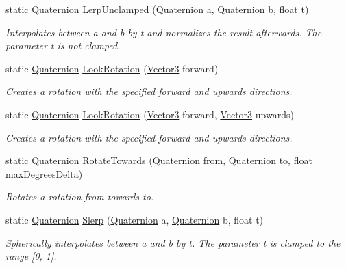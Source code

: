 \begin{DoxyCompactItemize}
static \mbox{\hyperlink{class_lua_1_1_quaternion}{Quaternion}} \mbox{\hyperlink{class_lua_1_1_quaternion_ad43d2f3aa2d460ed567351f97aba6bfe}{Lerp\+Unclamped}} (\mbox{\hyperlink{class_lua_1_1_quaternion}{Quaternion}} a, \mbox{\hyperlink{class_lua_1_1_quaternion}{Quaternion}} b, float t)
\begin{DoxyCompactList}\small\item\em Interpolates between a and b by t and normalizes the result afterwards. The parameter t is not clamped. \end{DoxyCompactList}\item 
static \mbox{\hyperlink{class_lua_1_1_quaternion}{Quaternion}} \mbox{\hyperlink{class_lua_1_1_quaternion_a7a17f92fd9d83a8b472db78d5cb74642}{Look\+Rotation}} (\mbox{\hyperlink{class_lua_1_1_vector3}{Vector3}} forward)
\begin{DoxyCompactList}\small\item\em Creates a rotation with the specified forward and upwards directions. \end{DoxyCompactList}\item 
static \mbox{\hyperlink{class_lua_1_1_quaternion}{Quaternion}} \mbox{\hyperlink{class_lua_1_1_quaternion_afa69beaa5748b6c941b9a3296d6c0638}{Look\+Rotation}} (\mbox{\hyperlink{class_lua_1_1_vector3}{Vector3}} forward, \mbox{\hyperlink{class_lua_1_1_vector3}{Vector3}} upwards)
\begin{DoxyCompactList}\small\item\em Creates a rotation with the specified forward and upwards directions. \end{DoxyCompactList}\item 
static \mbox{\hyperlink{class_lua_1_1_quaternion}{Quaternion}} \mbox{\hyperlink{class_lua_1_1_quaternion_abfa084dd85c43e01da75d9bcf3305871}{Rotate\+Towards}} (\mbox{\hyperlink{class_lua_1_1_quaternion}{Quaternion}} from, \mbox{\hyperlink{class_lua_1_1_quaternion}{Quaternion}} to, float max\+Degrees\+Delta)
\begin{DoxyCompactList}\small\item\em Rotates a rotation from towards to. \end{DoxyCompactList}\item 
static \mbox{\hyperlink{class_lua_1_1_quaternion}{Quaternion}} \mbox{\hyperlink{class_lua_1_1_quaternion_a8848906e3924791706bc0bc853a4572b}{Slerp}} (\mbox{\hyperlink{class_lua_1_1_quaternion}{Quaternion}} a, \mbox{\hyperlink{class_lua_1_1_quaternion}{Quaternion}} b, float t)
\begin{DoxyCompactList}\small\item\em Spherically interpolates between a and b by t. The parameter t is clamped to the range \mbox{[}0, 1\mbox{]}. \end{DoxyCompactList}\item 

\end{DoxyCompactItemize}
